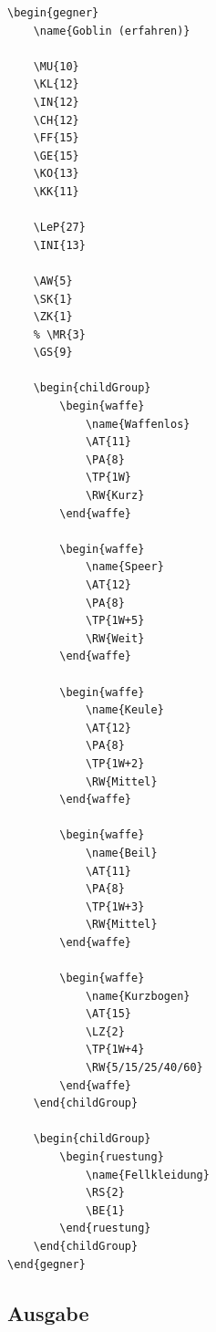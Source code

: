 \begin{verbatim}
\begin{gegner}
    \name{Goblin (erfahren)}

    \MU{10}
    \KL{12}
    \IN{12}
    \CH{12}
    \FF{15}
    \GE{15}
    \KO{13}
    \KK{11}
    
    \LeP{27}
    \INI{13}

    \AW{5}
    \SK{1}
    \ZK{1}
    % \MR{3}
    \GS{9}

    \begin{childGroup}
        \begin{waffe}
            \name{Waffenlos}
            \AT{11}
            \PA{8}
            \TP{1W}
            \RW{Kurz}
        \end{waffe}
    
        \begin{waffe}
            \name{Speer}
            \AT{12}
            \PA{8}
            \TP{1W+5}
            \RW{Weit}
        \end{waffe}
    
        \begin{waffe}
            \name{Keule}
            \AT{12}
            \PA{8}
            \TP{1W+2}
            \RW{Mittel}
        \end{waffe}
    
        \begin{waffe}
            \name{Beil}
            \AT{11}
            \PA{8}
            \TP{1W+3}
            \RW{Mittel}
        \end{waffe}
    
        \begin{waffe}
            \name{Kurzbogen}
            \AT{15}
            \LZ{2}
            \TP{1W+4}
            \RW{5/15/25/40/60}
        \end{waffe}
    \end{childGroup}

    \begin{childGroup}
        \begin{ruestung}
            \name{Fellkleidung}
            \RS{2}
            \BE{1}
        \end{ruestung}
    \end{childGroup}
\end{gegner}

\end{verbatim}

\subsection{Ausgabe}


